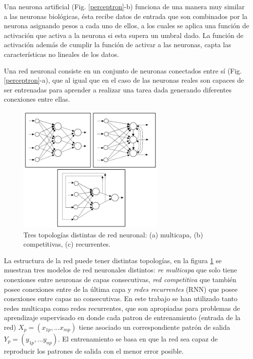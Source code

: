 Una neurona artificial (Fig. \ref{perceptron}-b) funciona de una manera muy similar a las neuronas biológicas, 
ésta recibe datos de entrada que son combinados por la neurona asignando pesos a cada uno de ellos, a los 
cuales se aplica una función de activación que activa a la neurona si esta supera un umbral 
dado. La función de activación además de cumplir la función de activar a las neuronas, capta las 
características no lineales de los datos. 

Una red neuronal consiste en un conjunto de neuronas conectados entre sí 
(Fig. \ref{perceptron}-a), que al igual que en el caso de las neuronas reales son capaces de ser entrenadas para aprender 
a realizar una tarea dada generando diferentes conexiones entre ellas. 

\begin{figure}[h!]
    \begin{center}
      \includegraphics[height=2.5in]{Figures/topologias.PNG}
      \caption{ Tres topologías distintas de red neuronal: (a) multicapa, (b) competitivas, (c) recurrentes. }
      \label{topologias}
    \end{center}
  \end{figure}

La estructura de la red puede tener distintas topologías, en la figura \ref{topologias} se muestran tres modelos de red neuronales 
distintos: \textit{re multicapa} que solo tiene conexiones entre neuronas de capas consecutivas, 
\textit{red competitiva} que también posee conexiones entre de la última capa y \textit{redes recurrentes} (RNN) que posee conexiones entre 
capas no consecutivas. En este trabajo se han utilizado tanto redes multicapa como redes recurrentes, que son apropiadas para problemas de 
aprendizaje supervisado en donde cada patron de entrenamiento (entrada de la red) $X_p=(x_{1p},...x_{mp})$ tiene asociado un 
correspondiente patrón de salida $Y_p=(y_{1p},...y_{np})$. 
El entrenamiento  se basa en que la red sea capaz de reproducir los patrones de salida con el menor error posible.

